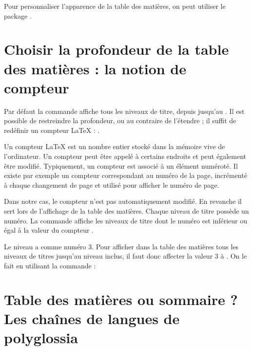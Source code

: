 \begin{plusloins}

Pour personnaliser l'apparence de la table des matières, on peut utiliser le package . 
\end{plusloins}

\section[Choix de la profondeur]{Choisir la profondeur de la table des matières : la notion de compteur}\label{tocdepth}

Par défaut la commande  affiche tous les niveaux de titre, depuis  jusqu'au . Il est possible de restreindre la profondeur, ou au contraire de l'étendre ; il suffit de redéfinir un compteur \LaTeX{} : .

Un compteur \LaTeX{} est un nombre entier stocké dans la mémoire vive de l'ordinateur. Un compteur peut être appelé à certains endroits et peut également être modifié. Typiquement, un compteur est associé à un élément numéroté. Il existe par exemple un compteur  correspondant au numéro de la page, incrémenté  à chaque changement de page et utilisé pour afficher le numéro de page.\label{compteur}

Dans notre cas, le compteur  n'est pas automatiquement modifié. En revanche il sert lors de l'affichage de la table des matières. Chaque niveau de titre possède un numéro. La commande  affiche les niveaux de titre dont le numéro est inférieur ou égal à la valeur du compteur .

Le niveau  a comme numéro 3. Pour afficher dans la table des matières tous les niveaux de titres jusqu'au niveau  inclus, il faut donc affecter la valeur 3 à  . On le fait en utilisant la commande  :

\begin{latexcode}
\setcounter{tocdepth}{3}
\tableofcontents
\end{latexcode}

\section[Table des matières ou sommaire ?]{Table des matières ou sommaire ? Les chaînes de langues de polyglossia}\label{i18npoly}

